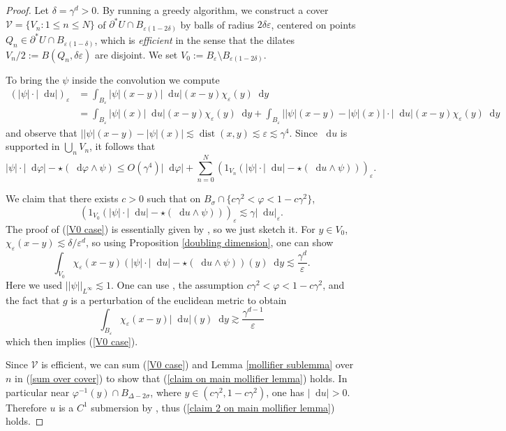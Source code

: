 \documentclass[reqno,10pt]{amsart}
\newcommand*\dif{\mathop{}\!\mathrm{d}}
\DeclareMathOperator{\dist}{dist}
\newcommand{\dfn}[1]{\emph{#1}\index{#1}}
\theoremstyle{definition}
\numberwithin{equation}{section}
\begin{document}
\begin{proof}
Let $\delta = \gamma^d > 0$.
By running a greedy algorithm, we construct a cover $\mathcal V = \{V_n: 1 \leq n \leq N\}$ of $\partial^* U \cap B_{\varepsilon(1 - 2\delta)}$ by balls of radius $2\delta\varepsilon$, centered on points $Q_n \in \partial^* U \cap B_{\varepsilon(1 - \delta)}$, which is \dfn{efficient} in the sense that the dilates $V_n/2 := B(Q_n, \delta\varepsilon)$ are disjoint.
We set $V_0 := B_\varepsilon \setminus B_{\varepsilon(1 - 2\delta)}$.

To bring the $\psi$ inside the convolution we compute
\begin{align*}
(|\psi| \cdot |\dif u|)_\varepsilon
&= \int_{B_\varepsilon} |\psi|(x - y) |\dif u|(x - y) \chi_\varepsilon(y) \dif y \\
&= \int_{B_\varepsilon} |\psi|(x) |\dif u|(x - y) \chi_\varepsilon(y) \dif y + \int_{B_\varepsilon} ||\psi|(x - y) - |\psi|(x)| \cdot |\dif u|(x - y) \chi_\varepsilon(y) \dif y
\end{align*}
and observe that $||\psi|(x - y) - |\psi|(x)| \lesssim \dist(x, y) \lesssim \varepsilon \lesssim \gamma^4$.
Since $\dif u$ is supported in $\bigcup_n V_n$, it follows that
\begin{equation}\label{sum over cover}
|\psi| \cdot |\dif \varphi| - \star(\dif \varphi \wedge \psi)
\leq O(\gamma^4) |\dif \varphi| + \sum_{n=0}^N (1_{V_n}(|\psi| \cdot |\dif u| - \star(\dif u \wedge \psi)))_\varepsilon.
\end{equation}

We claim that there exists $c > 0$ such that on $B_\sigma \cap \{c\gamma^2 < \varphi < 1 - c\gamma^2\}$,
\begin{equation}\label{V0 case}
(1_{V_0}(|\psi| \cdot |\dif u| - \star(\dif u \wedge \psi)))_\varepsilon \lesssim \gamma |\dif u|_\varepsilon.
\end{equation}
The proof of (\ref{V0 case}) is essentially given by \cite[pg92]{Giusti77}, so we just sketch it.
For $y \in V_0$, $\chi_\varepsilon(x - y) \lesssim \delta/\varepsilon^d$, so using Proposition \ref{doubling dimension}, one can show
$$\int_{V_0} \chi_\varepsilon(x - y)(|\psi| \cdot |\dif u| - \star(\dif u \wedge \psi))(y) \dif y \lesssim \frac{\gamma^d}{\varepsilon}.$$
Here we used $||\psi||_{L^\infty} \lesssim 1$.
One can use \cite[Lemma 7.1]{Giusti77}, the assumption $c\gamma^2 < \varphi < 1 - c\gamma^2$, and the fact that $g$ is a perturbation of the euclidean metric to obtain
$$\int_{B_\varepsilon} \chi_\varepsilon(x - y) |\dif u|(y) \dif y \gtrsim \frac{\gamma^{d - 1}}{\varepsilon}$$
which then implies (\ref{V0 case}).

Since $\mathcal V$ is efficient, we can sum (\ref{V0 case}) and Lemma \ref{mollifier sublemma} over $n$ in (\ref{sum over cover}) to show that (\ref{claim on main mollifier lemma}) holds.
In particular near $\varphi^{-1}(y) \cap B_{\Delta - 2\sigma}$, where $y \in (c\gamma^2, 1 - c\gamma^2)$, one has $|\dif u| > 0$.
Therefore $u$ is a $C^1$ submersion by \cite[Lemma 7.1]{Giusti77}, thus (\ref{claim 2 on main mollifier lemma}) holds.
\end{proof}
\end{document}
